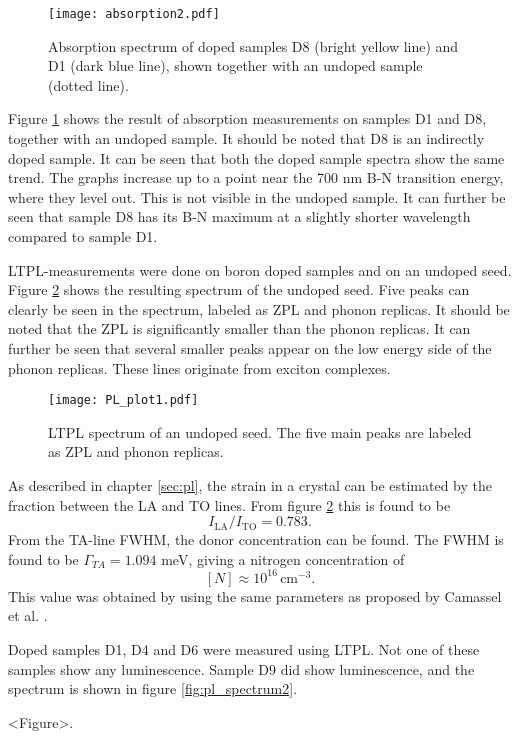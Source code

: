 \begin{figure}[h]
\begin{center}
\texttt{[image: absorption2.pdf]}
\caption{Absorption spectrum of doped samples D8 (bright yellow line) and D1 (dark blue line), shown together with an undoped sample (dotted line). 
\label{fig:abs2}}
\end{center}
\end{figure}

Figure \ref{fig:abs2} shows the result of absorption measurements on samples D1 and D8, together with an undoped sample. It should be noted that D8 is an indirectly doped sample. It can be seen that both the doped sample spectra show the same trend. The graphs increase up to a point near the 700 nm B-N transition energy, where they level out. This is not visible in the undoped sample. It can further be seen that sample D8 has its B-N maximum at a slightly shorter wavelength compared to sample D1. 



LTPL-measurements were done on boron doped samples and on an undoped seed. Figure \ref{fig:pl_spectrum1} shows the resulting spectrum of the undoped seed. Five peaks can clearly be seen in the spectrum, labeled as ZPL and phonon replicas. It should be noted that the ZPL is significantly smaller than the phonon replicas. It can further be seen that several smaller peaks appear on the low energy side of the phonon replicas. These lines originate from exciton complexes.  

\begin{figure}[h]
\begin{center}
\texttt{[image: PL\_plot1.pdf]}
\caption{LTPL spectrum of an undoped seed. The five main peaks are labeled as ZPL and phonon replicas. 
\label{fig:pl_spectrum1}}
\end{center}
\end{figure}

As described in chapter \ref{sec:pl}, the strain in a crystal can be estimated by the fraction between the LA and TO lines. From figure \ref{fig:pl_spectrum1} this is found to be 
\[I_\mathrm{LA}/I_\mathrm{TO} = 0.783.\]
From the TA-line FWHM, the donor concentration can be found. The FWHM is found to be $\Gamma_{TA} = 1.094$ meV, giving a nitrogen concentration of 
\[[N] \approx 10^{16} \, \mathrm{cm^{-3}}.\]
This value was obtained by using the same parameters as proposed by Camassel et al. \cite{Camassel2006}. 

Doped samples D1, D4 and D6 were measured using LTPL. Not one of these samples show any luminescence. Sample D9 did show luminescence, and the spectrum is shown in figure \ref{fig:pl_spectrum2}. 

<Figure>.


































